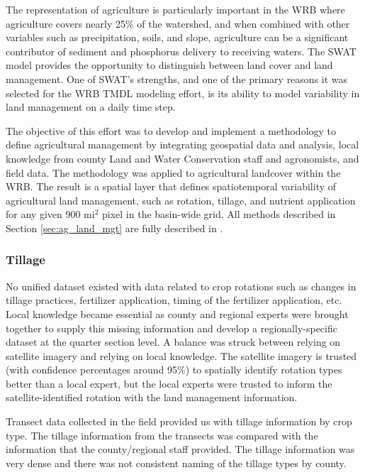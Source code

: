 The representation of agriculture is particularly important in the WRB where agriculture covers nearly
25\% of the watershed, and when combined with other variables such as precipitation, soils,
and slope, agriculture can be a significant contributor of sediment and phosphorus delivery to receiving waters.  The SWAT model provides the opportunity to distinguish between land cover and land management.  One of SWAT’s strengths, and one of the primary reasons it was selected for the WRB TMDL modeling effort, is its ability to model variability in land management on a daily time step.

The objective of this effort was to develop and implement a methodology to define agricultural management by integrating geospatial data and analysis, local knowledge from county Land and Water Conservation staff and agronomists, and field data. The methodology was applied to agricultural landcover within the WRB. The result is a spatial layer that defines spatiotemporal variability of agricultural land management, such as rotation, tillage, and nutrient application for any given 900 mi$^2$ pixel in the basin-wide grid. All methods described in Section \ref{sec:ag_land_mgt} are fully described in .

\subsubsection{Tillage}

No unified dataset existed with data related to crop rotations such as changes in tillage practices, fertilizer application, timing of the fertilizer application, etc.  Local knowledge became essential as county and regional experts were brought together to supply this missing information and develop a regionally-specific dataset at the quarter section level. A balance was struck between relying on satellite imagery and relying on local knowledge. The satellite imagery is trusted (with confidence percentages around 95\%) to spatially identify rotation types better than a local expert, but the local experts were trusted to inform the satellite-identified rotation with the land management information.  

Transect data collected in the field provided us with tillage information by crop type. The tillage information from the transects was compared with the information that the county/regional staff provided. The tillage information was very dense and there was not consistent naming of the tillage types by county.

